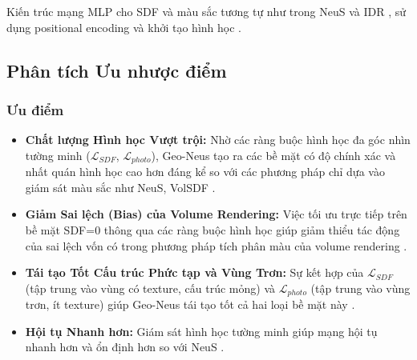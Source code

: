 Kiến trúc mạng MLP cho SDF và màu sắc tương tự như trong NeuS \cite{Wang2021NeuS} và IDR \cite{Yariv2020IDR}, sử dụng positional encoding \cite{Mildenhall2020NeRF} và khởi tạo hình học \cite{Atzmon2020SAL} \cite{Fu2022GeoNeus_source_145, Fu2022GeoNeus_source_146, Fu2022GeoNeus_source_147}.

\subsection{Phân tích Ưu nhược điểm}

\subsubsection{Ưu điểm}
\begin{itemize}
    \item \textbf{Chất lượng Hình học Vượt trội:} Nhờ các ràng buộc hình học đa góc nhìn tường minh ($\mathcal{L}_{SDF}$, $\mathcal{L}_{photo}$), Geo-Neus tạo ra các bề mặt có độ chính xác và nhất quán hình học cao hơn đáng kể so với các phương pháp chỉ dựa vào giám sát màu sắc như NeuS, VolSDF \cite{Fu2022GeoNeus_source_2, Fu2022GeoNeus_source_3, Fu2022GeoNeus_source_7, Fu2022GeoNeus_source_32, Fu2022GeoNeus_source_34, Fu2022GeoNeus_source_133, Fu2022GeoNeus_source_154, Fu2022GeoNeus_source_155, Fu2022GeoNeus_source_187}.
    \item \textbf{Giảm Sai lệch (Bias) của Volume Rendering:} Việc tối ưu trực tiếp trên bề mặt SDF=0 thông qua các ràng buộc hình học giúp giảm thiểu tác động của sai lệch vốn có trong phương pháp tích phân màu của volume rendering \cite{Fu2022GeoNeus_source_4, Fu2022GeoNeus_source_6, Fu2022GeoNeus_source_31, Fu2022GeoNeus_source_38, Fu2022GeoNeus_source_87, Fu2022GeoNeus_source_178}.
    \item \textbf{Tái tạo Tốt Cấu trúc Phức tạp và Vùng Trơn:} Sự kết hợp của $\mathcal{L}_{SDF}$ (tập trung vào vùng có texture, cấu trúc mỏng) và $\mathcal{L}_{photo}$ (tập trung vào vùng trơn, ít texture) giúp Geo-Neus tái tạo tốt cả hai loại bề mặt này \cite{Fu2022GeoNeus_source_7, Fu2022GeoNeus_source_34, Fu2022GeoNeus_source_40, Fu2022GeoNeus_source_156, Fu2022GeoNeus_source_169, Fu2022GeoNeus_source_170, Fu2022GeoNeus_source_186}.
    \item \textbf{Hội tụ Nhanh hơn:} Giám sát hình học tường minh giúp mạng hội tụ nhanh hơn và ổn định hơn so với NeuS \cite{Fu2022GeoNeus_source_105, Fu2022GeoNeus_source_180, Fu2022GeoNeus_source_182}.
\end{itemize}

